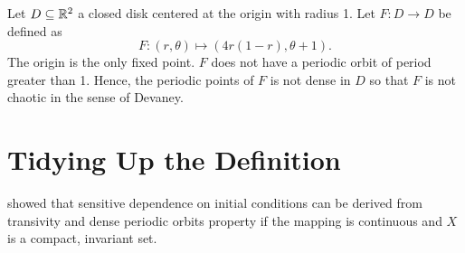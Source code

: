 \documentclass[12pt,draft,twoside]{book}
\begin{document}
  \begin{example}
    Let $D \subseteq \mathbb{R}^2$ a closed disk centered at the origin with radius 1.
    Let $F: D \to D$ be defined as
    \begin{equation*}
      F: (r, \theta) \mapsto (4r(1 - r), \theta + 1).
    \end{equation*}
    The origin is the only fixed point.
    $F$ does not have a periodic orbit of period greater than 1.
    Hence, the periodic points of $F$ is not dense in $D$ so that $F$ is not chaotic in the sense of Devaney.
  \end{example}

  \section{Tidying Up the Definition}
  \citet{banks} showed that sensitive dependence on initial conditions can be derived from transivity and dense periodic orbits property if the mapping is continuous and $X$ is a compact, invariant set. 
\end{document}

